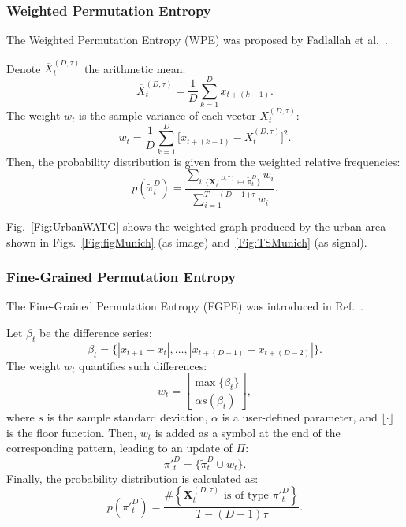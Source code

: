 \documentclass[journal]{IEEEtran}
\begin{document}
\subsubsection{Weighted Permutation Entropy}\label{WPE}

The Weighted Permutation Entropy (WPE) was proposed by Fadlallah et al.~\cite{Fadlallah2013Weightedpermutation}. 

Denote $\overline{X}_t^{(D, \tau)}$ the arithmetic mean:
\begin{equation}
\overline{X}_t^{(D, \tau)} = \frac{1}{D} \sum_{k = 1}^{D} x_{t + (k - 1)}.
\end{equation}
The weight $w_{t}$ is the sample variance of each vector $X_t^{(D, \tau)}$:
\begin{equation}
w_{t} = \frac{1}{D} \sum_{k = 1}^{D}\big[x_{t + (k - 1)} - \overline{X}_t^{(D, \tau)}\big]^2 .
\end{equation}
Then, the probability distribution is given from the weighted relative frequencies:
\begin{equation}
p(\widetilde \pi_t^D) = \frac{\sum_{i : \{\mathbf{X}^{(D,\tau)}_i \mapsto \widetilde\pi^D_t\}} w_{i}}{\sum_{i = 1}^{T-(D-1)\tau} w_{i}}.
\end{equation}

Fig.~\ref{Fig:UrbanWATG} shows the weighted graph produced by the urban area shown in Figs.~\ref{Fig:figMunich} (as image) and~\ref{Fig:TSMunich} (as signal).

\subsubsection{Fine-Grained Permutation Entropy}\label{FGPE}

The Fine-Grained Permutation Entropy (FGPE) was introduced in Ref.~\cite{xiao2009fine}.

Let $\beta_t$ be the difference series:
\begin{equation}
\beta_t = \big\{|x_{t+1} - x_t|, \dots, |x_{t+(D-1)} - x_{t+(D-2)}|\big\}.
\end{equation}
The weight $w_t$ quantifies such differences:
\begin{equation}
w_t = \left \lfloor \frac{\max\{\beta_t\}}{\alpha s(\beta_t) } \right \rfloor,
\end{equation}
where $s$ is the sample standard deviation,
$\alpha$ is a user-defined parameter, 
and $\lfloor\cdot \rfloor$ is the floor function.
Then, $w_t$ is added as a symbol at the end of the corresponding pattern, leading to an update of $\Pi$:
\begin{equation}
\pi{'}_t^D = \{ \widetilde \pi_t^D \cup w_t\}.
\end{equation} 
Finally, the probability distribution is calculated as:
\begin{equation}
p(\pi{'}_t^D) = \frac{\#\left \{\mathbf{X}_t^{(D,\tau)} \text{ is of type } \pi{'}_t^D\right \}}{T- (D-1)\tau}.
\end{equation}
\end{document}
